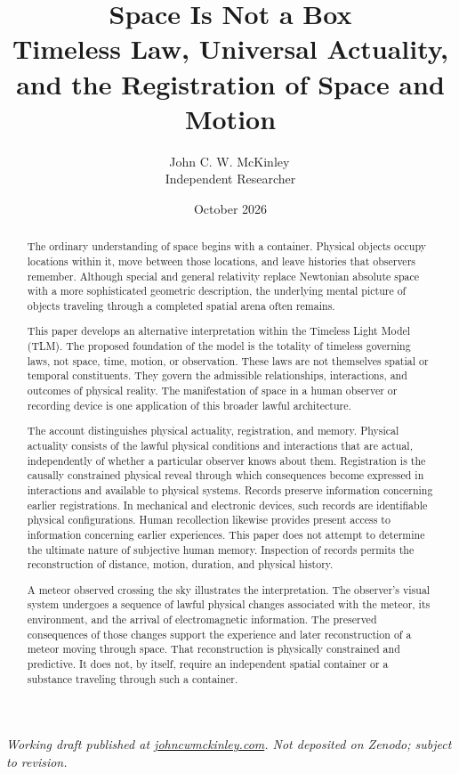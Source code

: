 \documentclass[12pt,onecolumn]{article}
\title{
\textbf{Space Is Not a Box}\\[0.4em]
\large Timeless Law, Universal Actuality,
and the Registration of Space and Motion
}
\author{
John C. W. McKinley\,\orcidlink{0009-0005-7097-5035}\\
\small Independent Researcher
}
\date{October 2026}
\begin{document}
\maketitle

\noindent\footnotesize\textit{Working draft published at \href{https://johncwmckinley.com}{johncwmckinley.com}. Not deposited on Zenodo; subject to revision.}\normalsize

\begin{abstract}
The ordinary understanding of space begins with a container. Physical objects occupy locations within it, move between those locations, and leave histories that observers remember. Although special and general relativity replace Newtonian absolute space with a more sophisticated geometric description, the underlying mental picture of objects traveling through a completed spatial arena often remains.

This paper develops an alternative interpretation within the Timeless Light Model (TLM). The proposed foundation of the model is the totality of timeless governing laws, not space, time, motion, or observation. These laws are not themselves spatial or temporal constituents. They govern the admissible relationships, interactions, and outcomes of physical reality. The manifestation of space in a human observer or recording device is one application of this broader lawful architecture.

The account distinguishes physical actuality, registration, and memory. Physical actuality consists of the lawful physical conditions and interactions that are actual, independently of whether a particular observer knows about them. Registration is the causally constrained physical reveal through which consequences become expressed in interactions and available to physical systems. Records preserve information concerning earlier registrations. In mechanical and electronic devices, such records are identifiable physical configurations. Human recollection likewise provides present access to information concerning earlier experiences. This paper does not attempt to determine the ultimate nature of subjective human memory. Inspection of records permits the reconstruction of distance, motion, duration, and physical history.

A meteor observed crossing the sky illustrates the interpretation. The observer's visual system undergoes a sequence of lawful physical changes associated with the meteor, its environment, and the arrival of electromagnetic information. The preserved consequences of those changes support the experience and later reconstruction of a meteor moving through space. That reconstruction is physically constrained and predictive. It does not, by itself, require an independent spatial container or a substance traveling through such a container.


\end{abstract}
\end{document}
